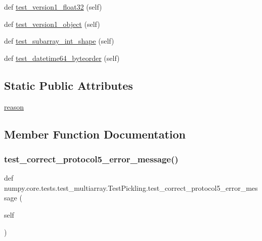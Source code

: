 \begin{DoxyCompactItemize}
\item 
def \hyperlink{classnumpy_1_1core_1_1tests_1_1test__multiarray_1_1TestPickling_abf09a7bc4fdc1b6cb3ecf986cc2c63a0}{test\+\_\+version1\+\_\+float32} (self)
\item 
def \hyperlink{classnumpy_1_1core_1_1tests_1_1test__multiarray_1_1TestPickling_a4a92a691df4f350d9f3e6f75f43d473c}{test\+\_\+version1\+\_\+object} (self)
\item 
def \hyperlink{classnumpy_1_1core_1_1tests_1_1test__multiarray_1_1TestPickling_a90a95b47b838d875df8bc4acf52b1120}{test\+\_\+subarray\+\_\+int\+\_\+shape} (self)
\item 
def \hyperlink{classnumpy_1_1core_1_1tests_1_1test__multiarray_1_1TestPickling_a706d98f3869b709b578ba51eaa3c1a6d}{test\+\_\+datetime64\+\_\+byteorder} (self)
\end{DoxyCompactItemize}
\subsection*{Static Public Attributes}
\begin{DoxyCompactItemize}
\item 
\hyperlink{classnumpy_1_1core_1_1tests_1_1test__multiarray_1_1TestPickling_a6fe3f5b68c7eddea7bf821f177faf082}{reason}
\end{DoxyCompactItemize}


\subsection{Member Function Documentation}
\mbox{\label{classnumpy_1_1core_1_1tests_1_1test__multiarray_1_1TestPickling_a5d532f8e5c05c731dc448648e3728b8d}} 
\subsubsection{\texorpdfstring{test\+\_\+correct\+\_\+protocol5\+\_\+error\+\_\+message()}{test\_correct\_protocol5\_error\_message()}}
{\footnotesize\ttfamily def numpy.\+core.\+tests.\+test\+\_\+multiarray.\+Test\+Pickling.\+test\+\_\+correct\+\_\+protocol5\+\_\+error\+\_\+message (\begin{DoxyParamCaption}\item[{}]{self }\end{DoxyParamCaption})}

